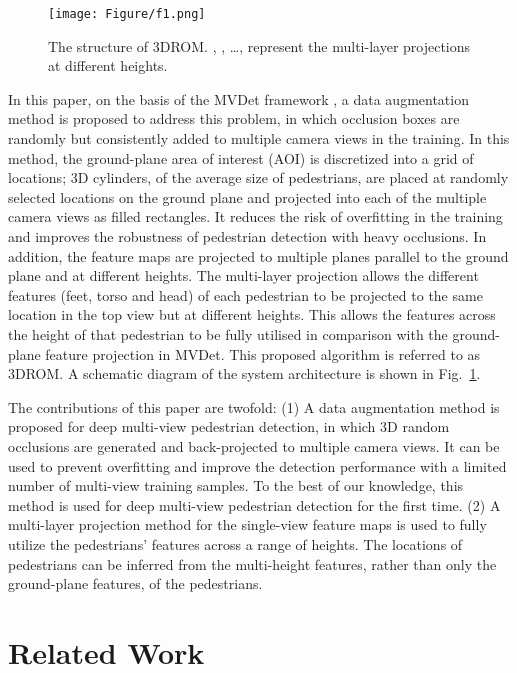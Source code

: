 \documentclass[runningheads]{llncs}
\begin{document}
	\begin{figure}[t]
		\centering
		\texttt{[image: Figure/f1.png]}
\caption{The structure of 3DROM. , , \dots,  represent the multi-layer projections at different heights.}
		\label{f1}
	\end{figure}
	In this paper, on the basis of the MVDet framework \cite{hou2020multiview}, a data augmentation method is proposed to address this problem, in which occlusion boxes are randomly but consistently added to multiple camera views in the training. In this method, the ground-plane area of interest (AOI) is discretized into a grid of locations; 3D cylinders, of the average size of pedestrians, are placed at randomly selected locations on the ground plane and projected into each of the multiple camera views as filled rectangles. It reduces the risk of overfitting in the training and improves the robustness of pedestrian detection with heavy occlusions. In addition, the feature maps are projected to multiple planes parallel to the ground plane and at different heights.
	The multi-layer projection allows the different features (feet, torso and head) of each pedestrian to be projected to the same location in the top view but at different heights. This allows the features across the height of that pedestrian to be fully utilised in comparison with the ground-plane feature projection in MVDet. This proposed algorithm is referred to as 3DROM. A schematic diagram of the system architecture is shown in Fig.~\ref{f1}.
	
	The contributions of this paper are twofold:
	(1) A data augmentation method is proposed for deep multi-view pedestrian detection, in which 3D random occlusions are generated and back-projected to multiple camera views. It can be used to prevent overfitting and improve the detection performance with a limited number of multi-view training samples.
	To the best of our knowledge, this method is used for deep multi-view pedestrian detection for the first time.
(2) A multi-layer projection method for the single-view feature maps is used to fully utilize the pedestrians' features across a range of heights. The locations of pedestrians can be inferred from the multi-height features, rather than only the ground-plane features, of the pedestrians.
	


	\section{Related Work}
\end{document}
